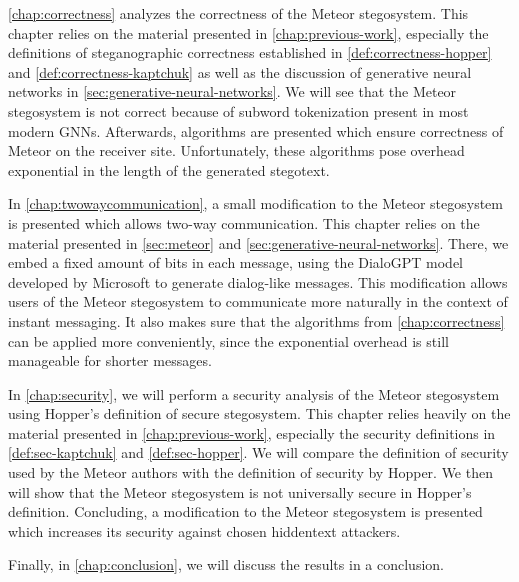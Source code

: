 \autoref{chap:correctness} analyzes the correctness of the Meteor stegosystem. 
This chapter relies on the material presented in \autoref{chap:previous-work}, especially the definitions of steganographic correctness established in \autoref{def:correctness-hopper} and \autoref{def:correctness-kaptchuk} as well as the discussion of generative neural networks in \autoref{sec:generative-neural-networks}.
We will see that the Meteor stegosystem is not correct because of subword tokenization present in most modern GNNs.
Afterwards, algorithms are presented which ensure correctness of Meteor on the receiver site.
Unfortunately, these algorithms pose overhead exponential in the length of the generated stegotext.

In \autoref{chap:twowaycommunication}, a small modification to the Meteor stegosystem is presented which allows two-way communication.
This chapter relies on the material presented in \autoref{sec:meteor} and \autoref{sec:generative-neural-networks}.
There, we embed a fixed amount of bits in each message, using the DialoGPT model developed by Microsoft \cite{Zhang2020} to generate dialog-like messages.
This modification allows users of the Meteor stegosystem to communicate more naturally in the context of instant messaging.
It also makes sure that the algorithms from \autoref{chap:correctness} can be applied more conveniently, since the exponential overhead is still manageable for shorter messages.

In \autoref{chap:security}, we will perform a security analysis of the Meteor stegosystem using Hopper's definition of secure stegosystem.
This chapter relies heavily on the material presented in \autoref{chap:previous-work}, especially the security definitions in \autoref{def:sec-kaptchuk} and \autoref{def:sec-hopper}.
We will compare the definition of security used by the Meteor authors with the definition of security by Hopper.
We then will show that the Meteor stegosystem is not universally secure in Hopper's definition.
Concluding, a modification to the Meteor stegosystem is presented which increases its security against chosen hiddentext attackers.

Finally, in \autoref{chap:conclusion}, we will discuss the results in a conclusion.